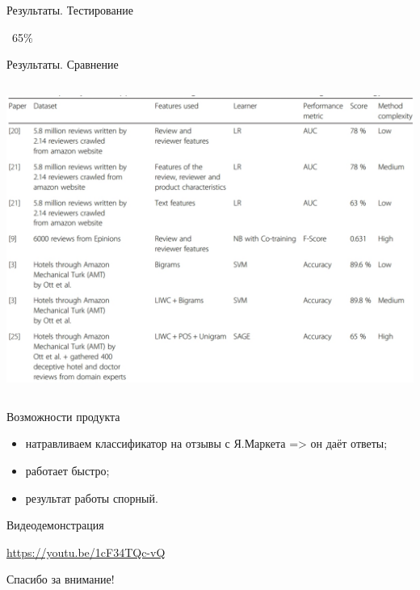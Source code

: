 \documentclass[mathserif,utf8,14pt]{beamer}
\begin{document}
\begin{frame}{Результаты. Тестирование}
     \addtocounter{framenumber}{-1}
     \begin{center}
        \Huge ~65\%
     \end{center}
\end{frame}

\begin{frame}{Результаты. Сравнение}
     \addtocounter{framenumber}{-1}
     \begin{columns}
         \column{\dimexpr\paperwidth-10pt}
     \includegraphics[scale=0.3]{./converted_jpg.pdf}
     \end{columns}
\end{frame}

\begin{frame}{Возможности продукта}
    \begin{itemize}
        \item натравливаем классификатор на отзывы с Я.Маркета => он даёт ответы;
        \item работает быстро;
        \item результат работы спорный.
    \end{itemize}
\end{frame}

\begin{frame}{Видеодемонстрация}
    \begin{center}
        \url{https://youtu.be/1cF34TQc-vQ}
    \end{center}
\end{frame}
 
\begin{frame}{}
     \addtocounter{framenumber}{-1}
    \begin{center}
    \large Спасибо за внимание!
    \end{center}
\end{frame}
\end{document}
